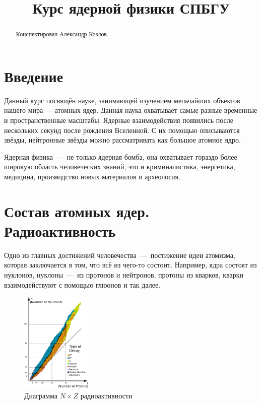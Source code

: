 \documentclass[12pt]{article}
\title{Курс ядерной физики СПБГУ}
\begin{document}
\maketitle
\newpage
\begin{abstract}
Конспектировал Александр Козлов.
\end{abstract}
\newpage
\tableofcontents
\newpage
\section{Введение}
Данный курс посвящён науке, занимающей изучением мельчайших объектов нашего мира --- атомных ядер. Данная наука охватывает самые разные временные и пространственные масштабы. Ядерные взаимодействия появились после нескольких секунд после рождения Вселенной. С их помощью описываются звёзды, нейтронные звёзды можно рассматривать как большое атомное ядро. 

\par
Ядерная физика~\----~не только ядерная бомба, она охватывает гораздо более широкую область человеческих знаний, это и криминалистика, энергетика, медицина, производство новых материалов и археология. 

\section{Состав атомных ядер. Радиоактивность}
Одно из главных достижений человечества~\----~постижение идеи атомизма, которая заключается в том, что всё из чего\--то состоит. Например, ядра состоят из нуклонов, нуклоны~\----~из протонов и нейтронов, протоны из кварков, кварки взаимодействуют с помощью глюонов и так далее.

\begin{figure}
\centering
\includegraphics[width=0.3\textwidth]{1.png}
\caption{\label{1}Диаграмма $N \times Z$ радиоактивности}
\end{figure}
\end{document}
